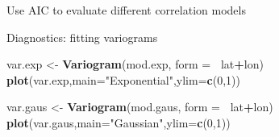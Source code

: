 \documentclass[
  ignorenonframetext,
]{beamer}
\newenvironment{Shaded}{\begin{snugshade}}{\end{snugshade}}
\newcommand{\DataTypeTok}[1]{\textcolor[rgb]{0.13,0.29,0.53}{#1}}
\newcommand{\DecValTok}[1]{\textcolor[rgb]{0.00,0.00,0.81}{#1}}
\newcommand{\FloatTok}[1]{\textcolor[rgb]{0.00,0.00,0.81}{#1}}
\newcommand{\KeywordTok}[1]{\textcolor[rgb]{0.13,0.29,0.53}{\textbf{#1}}}
\newcommand{\NormalTok}[1]{#1}
\newcommand{\OperatorTok}[1]{\textcolor[rgb]{0.81,0.36,0.00}{\textbf{#1}}}
\newcommand{\StringTok}[1]{\textcolor[rgb]{0.31,0.60,0.02}{#1}}
\begin{document}
\begin{frame}[fragile]{Use AIC to evaluate different correlation models}
\protect\hypertarget{use-aic-to-evaluate-different-correlation-models}{}

\begin{Shaded}
\end{Shaded}

\end{frame}

\begin{frame}[fragile]{Diagnostics: fitting variograms}
\protect\hypertarget{diagnostics-fitting-variograms}{}

\begin{Shaded}
\begin{Highlighting}[]
\NormalTok{var.exp <-}\StringTok{ }\KeywordTok{Variogram}\NormalTok{(mod.exp, }\DataTypeTok{form =}\OperatorTok{~}\StringTok{ }\NormalTok{lat}\OperatorTok{+}\NormalTok{lon)}
\KeywordTok{plot}\NormalTok{(var.exp,}\DataTypeTok{main=}\StringTok{"Exponential"}\NormalTok{,}\DataTypeTok{ylim=}\KeywordTok{c}\NormalTok{(}\DecValTok{0}\NormalTok{,}\DecValTok{1}\NormalTok{))}

\NormalTok{var.gaus <-}\StringTok{ }\KeywordTok{Variogram}\NormalTok{(mod.gaus, }\DataTypeTok{form =}\OperatorTok{~}\StringTok{ }\NormalTok{lat}\OperatorTok{+}\NormalTok{lon)}
\KeywordTok{plot}\NormalTok{(var.gaus,}\DataTypeTok{main=}\StringTok{"Gaussian"}\NormalTok{,}\DataTypeTok{ylim=}\KeywordTok{c}\NormalTok{(}\DecValTok{0}\NormalTok{,}\DecValTok{1}\NormalTok{))}
\end{Highlighting}
\end{Shaded}

\end{frame}
\end{document}

